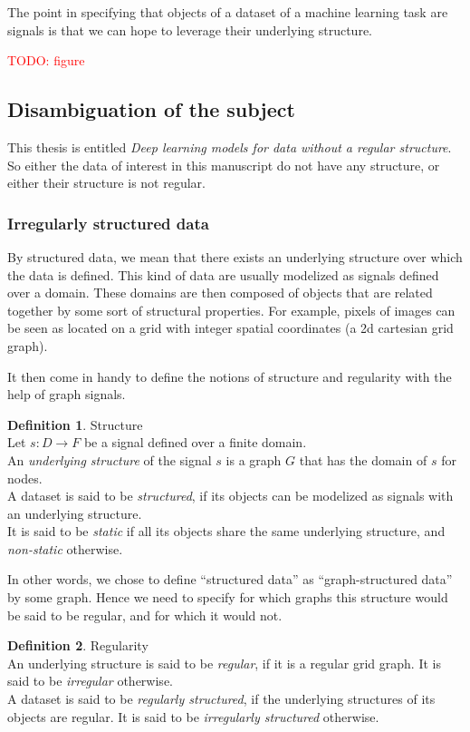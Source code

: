 \documentclass{article}
\theoremstyle{definition}
\newtheorem{definition}{Definition}[section]
\begin{document}
The point in specifying that objects of a dataset of a machine learning task are signals is that we can hope to leverage their underlying structure.

\textcolor{red}{TODO: figure}

\subsection{Disambiguation of the subject}

This thesis is entitled \emph{Deep learning models for data without a regular structure}.
So either the data of interest in this manuscript do not have any structure, or either their structure is not regular.

\subsubsection{Irregularly structured data}

By structured data, we mean that there exists an underlying structure over which the data is defined. This kind of data are usually modelized as signals defined over a domain. These domains are then composed of objects that are related together by some sort of structural properties. For example, pixels of images can be seen as located on a grid with integer spatial coordinates (a 2d cartesian grid graph).

It then come in handy to define the notions of structure and regularity with the help of graph signals.

\begin{definition}{Structure}\\
  Let $s: D \rightarrow F$ be a signal defined over a finite domain.\\
  An \emph{underlying structure} of the signal $s$ is a graph $G$ that has the domain of $s$ for nodes.\\
  A dataset is said to be \emph{structured}, if its objects can be modelized as signals with an underlying structure.\\
  It is said to be \emph{static} if all its objects share the same underlying structure, and \emph{non-static} otherwise.
\end{definition}

In other words, we chose to define ``structured data'' as ``graph-structured data'' by some graph. Hence we need to specify for which graphs this structure would be said to be regular, and for which it would not.

\begin{definition}{Regularity}\\
An underlying structure is said to be \emph{regular}, if it is a regular grid graph.
It is said to be \emph{irregular} otherwise.\\
A dataset is said to be \emph{regularly structured}, if the underlying structures of its objects are regular.
It is said to be \emph{irregularly structured} otherwise.
\end{definition}
\end{document}
